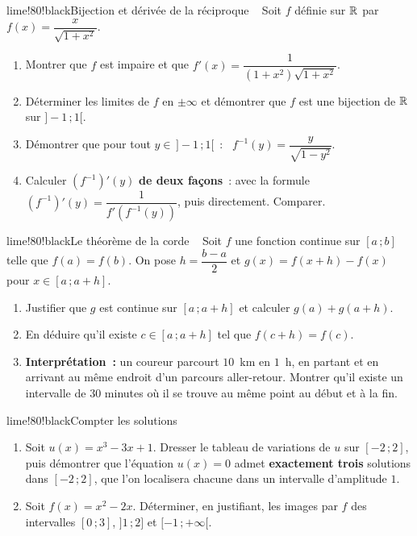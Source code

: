 \begin{exo}{lime!80!black}{Bijection et dérivée de la réciproque \demo\ }
Soit $f$ définie sur $\mathbb{R}$ par \ $f(x)=\dfrac{x}{\sqrt{1+x^2}}$.
\begin{enumerate}
  \item Montrer que $f$ est impaire et que $f'(x)=\dfrac{1}{(1+x^2)\sqrt{1+x^2}}$.
  \item Déterminer les limites de $f$ en $\pm\infty$ et démontrer que $f$ est une bijection de $\mathbb{R}$ sur $]-1\,;1[$.
  \item Démontrer que pour tout $y\in\,]-1\,;1[$~: \ $f^{-1}(y)=\dfrac{y}{\sqrt{1-y^2}}$.
  \item Calculer $\left(f^{-1}\right)'(y)$ \textbf{de deux façons}~: avec la formule $\left(f^{-1}\right)'(y)=\dfrac1{f'\left(f^{-1}(y)\right)}$, puis directement. Comparer.
\end{enumerate}
\end{exo}

\begin{exo}{lime!80!black}{Le théorème de la corde \demo\ }
Soit $f$ une fonction continue sur $[a\,;b]$ telle que $f(a)=f(b)$. On pose $h=\dfrac{b-a}{2}$ et $g(x)=f(x+h)-f(x)$ pour $x\in[a\,;a+h]$.
\begin{enumerate}
  \item Justifier que $g$ est continue sur $[a\,;a+h]$ et calculer $g(a)+g(a+h)$.
  \item En déduire qu'il existe $c\in[a\,;a+h]$ tel que $f(c+h)=f(c)$.
  \item \textbf{Interprétation~:} un coureur parcourt $10$~km en $1$~h, en partant et en arrivant au même endroit d'un parcours aller-retour. Montrer qu'il existe un intervalle de $30$ minutes où il se trouve au même point au début et à la fin.
\end{enumerate}
\end{exo}

\begin{exo}{lime!80!black}{Compter les solutions }
\begin{enumerate}
  \item Soit $u(x)=x^3-3x+1$. Dresser le tableau de variations de $u$ sur $[-2\,;2]$, puis démontrer que l'équation $u(x)=0$ admet \textbf{exactement trois} solutions dans $[-2\,;2]$, que l'on localisera chacune dans un intervalle d'amplitude $1$.
  \item Soit $f(x)=x^2-2x$. Déterminer, en justifiant, les images par $f$ des intervalles $[0\,;3]$, $]1\,;2]$ et $[-1\,;+\infty[$.
\end{enumerate}
\end{exo}

